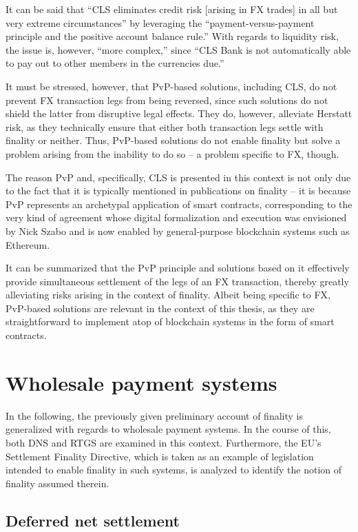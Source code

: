It can be said that ``CLS eliminates credit risk [arising in FX trades] in all but very extreme circumstances'' by leveraging the ``payment-versus-payment principle and the positive account balance rule.'' \autocite[62]{galati2002}
With regards to liquidity risk, the issue is, however, ``more complex,'' since ``CLS Bank is not automatically able to pay out to other members in the currencies due.'' \autocite[63]{galati2002}

It must be stressed, however, that PvP-based solutions, including CLS, do not prevent FX transaction legs from being reversed, since such solutions do not shield the latter from disruptive legal effects.
They do, however, alleviate Herstatt risk, as they technically ensure that either both transaction legs settle with finality or neither.
Thus, PvP-based solutions do not enable finality but solve a problem arising from the inability to do so -- a problem specific to FX, though.

The reason PvP and, specifically, CLS is presented in this context is not only due to the fact that it is typically mentioned in publications on finality -- it is because PvP represents an archetypal application of smart contracts, corresponding to the very kind of agreement whose digital formalization and execution was envisioned by Nick Szabo and is now enabled by general-purpose blockchain systems such as Ethereum.

It can be summarized that the PvP principle and solutions based on it effectively provide simultaneous settlement of the legs of an FX transaction, thereby greatly alleviating risks arising in the context of finality.
Albeit being specific to FX, PvP-based solutions are relevant in the context of this thesis, as they are straightforward to implement atop of blockchain systems in the form of smart contracts.

\section{Wholesale payment systems}

In the following, the previously given preliminary account of finality is generalized with regards to wholesale payment systems.
In the course of this, both DNS and RTGS are examined in this context.
Furthermore, the EU's Settlement Finality Directive, which is taken as an example of legislation intended to enable finality in such systems, is analyzed to identify the notion of finality assumed therein.

\subsection{Deferred net settlement}


